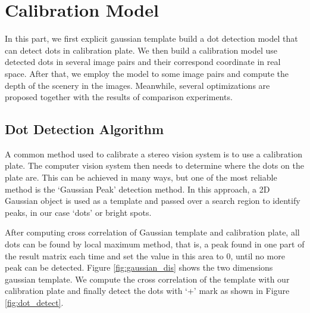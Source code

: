 \chapter{Calibration Model}

In this part, we first explicit gaussian template build a dot detection model that can detect dots in calibration plate. We then build a calibration model use detected dots in several image pairs and their correspond coordinate in real space. After that, we employ the model to some image pairs and compute the depth of the scenery in the images. Meanwhile, several optimizations are proposed together with the results of comparison experiments.

\section{Dot Detection Algorithm}

A common method used to calibrate a stereo vision system is to use a calibration plate. The computer vision system then needs to determine where the dots on the plate are. This can be achieved in many ways, but one of the most reliable method is the ‘Gaussian Peak’ detection method. In this approach, a 2D Gaussian object is used as a template and passed over a search region to identify peaks, in our case ‘dots’ or bright spots. 

After computing cross correlation of Gaussian template and calibration plate, all dots can be found by local maximum method, that is, a peak found in one part of the result matrix each time and set the value in this area to 0, until no more peak can be detected. Figure \ref{fig:gaussian_dis} shows the two dimensions gaussian template. We compute the cross correlation of the template with our calibration plate and finally detect the dots with `+' mark as shown in Figure \ref{fig:dot_detect}.


